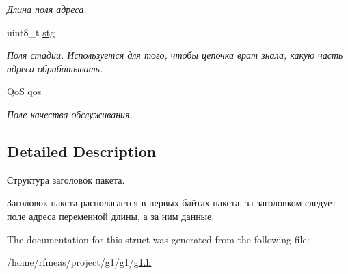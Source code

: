 \begin{DoxyCompactItemize}
\begin{DoxyCompactList}\small\item\em Длина поля адреса. \end{DoxyCompactList}\item 
uint8\+\_\+t \hyperlink{structg1_1_1package__header_ade59c95e617ca8789a408c9aaa0ab088}{stg}\hypertarget{structg1_1_1package__header_ade59c95e617ca8789a408c9aaa0ab088}{}\label{structg1_1_1package__header_ade59c95e617ca8789a408c9aaa0ab088}

\begin{DoxyCompactList}\small\item\em Поля стадии. Используется для того, чтобы цепочка врат знала, какую часть адреса обрабатывать. \end{DoxyCompactList}\item 
\hyperlink{g1_8h_a157fb77f1b8142697dc1b88efaae6a0a}{QoS} \hyperlink{structg1_1_1package__header_aea47ad75b2af7d91d1f460ff5887c751}{qos}\hypertarget{structg1_1_1package__header_aea47ad75b2af7d91d1f460ff5887c751}{}\label{structg1_1_1package__header_aea47ad75b2af7d91d1f460ff5887c751}

\begin{DoxyCompactList}\small\item\em Поле качества обслуживания. \end{DoxyCompactList}\end{DoxyCompactItemize}


\subsection{Detailed Description}
Структура заголовок пакета. 

Заголовок пакета располагается в первых байтах пакета. за заголовком следует поле адреса переменной длины, а за ним данные. 

The documentation for this struct was generated from the following file\+:\begin{DoxyCompactItemize}
\item 
/home/rfmeas/project/g1/g1/\hyperlink{g1_8h}{g1.\+h}\end{DoxyCompactItemize}
